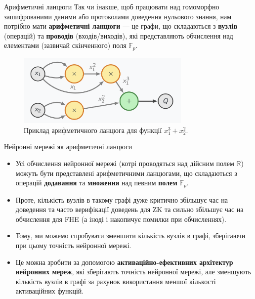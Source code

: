 \documentclass{zkdl-presentation-template}
\begin{document}
    \begin{frame}{Арифметичні ланцюги}
        Так чи інакше, щоб працювати над гомоморфно зашифрованими даними або
        протоколами доведення нульового знання, нам потрібно мати
        \textbf{арифметичні ланцюги} --- це графи, що складаються з
        \textbf{вузлів} (операцій) та \textbf{проводів} (входів/виходів), які
        представляють обчислення над елементами (зазвичай скінченного) поля
        $\mathbb{F}_p$.

        \begin{figure}
            \centering
            \includegraphics[width=0.75\textwidth]{images/circuits.png}
            \caption{Приклад арифметичного ланцюга для функції $x_1^3 + x_2^2$.}
            \label{fig:arithmetic-circuit}
        \end{figure}
    \end{frame}

    \begin{frame}{Нейронні мережі як арифметичні ланцюги}
        \begin{itemize}
            \item Усі обчислення нейронної мережі (котрі проводяться 
            над дійсним полем $\mathbb{R}$) можуть бути представлені
            арифметичними ланцюгами, що складаються з операцій
            \textbf{додавання} та \textbf{множення} над певним 
            \textbf{полем} $\mathbb{F}_p$.
            \item Проте, кількість вузлів в такому графі дуже критично 
            збільшує час на доведення та часто верифікації доведень для 
            ZK та сильно збільшує час на обчислення для FHE (а іноді і накопичує 
            помилки при обчисленнях).
            \item Тому, ми можемо спробувати зменшити кількість вузлів
            в графі, зберігаючи при цьому точність нейронної мережі.
            \item Це можна зробити за допомогою \textbf{активаційно-ефективних
            архітектур нейронних мереж}, які зберігають точність нейронної
            мережі, але зменшують кількість вузлів в графі за рахунок
            використання меншої кількості активаційних функцій.
        \end{itemize}    
    \end{frame}
\end{document}
